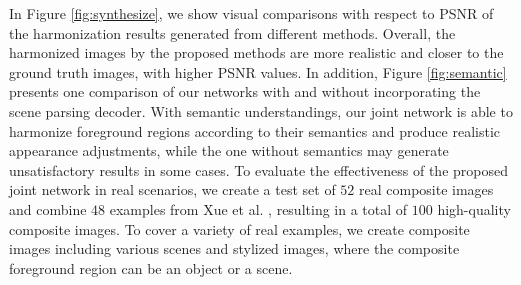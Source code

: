 \documentclass[10pt,twocolumn,letterpaper]{article}
\begin{document}

In Figure \ref{fig:synthesize}, we show visual comparisons with respect to PSNR of the harmonization results generated from different methods.
%
Overall, the harmonized images by the proposed methods are more realistic and closer to the ground truth images, with higher PSNR values. 
%
In addition, Figure \ref{fig:semantic} presents one comparison of our networks with and without incorporating the scene parsing decoder.
%
With semantic understandings, our joint network is able to harmonize foreground regions according to their semantics and produce realistic appearance adjustments, while the one without semantics may generate unsatisfactory results in some cases.
%
{}
%
To evaluate the effectiveness of the proposed joint network in real scenarios, we create a test set of $52$ real composite images and combine $48$ examples from 
Xue et al. \cite{Xue_siggraph_2012}, resulting in a total of $100$ high-quality composite images.
%
To cover a variety of real examples, we create composite images including various scenes and stylized images, where the composite foreground region can be an object or a scene.
\end{document}
